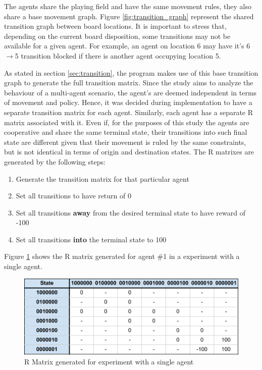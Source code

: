 \documentclass[11pt]{article}
\begin{document}
    The agents share the playing field and have the same movement rules, they also share a base movement graph. Figure \ref{fig:transition_graph} represent the shared transition graph between board locations. It is important to stress that, depending on the current board disposition, some transitions may not be available for a given agent. For example, an agent on location 6 may have it's 6$\rightarrow$5 transition blocked if there is another agent occupying location 5.

    As stated in section \ref{sec:transition}, the program makes use of this base transition graph to generate the full transition matrix. Since the study aims to analyze the behaviour of a multi-agent scenario, the agent's are deemed independent in terms of movement and policy. Hence, it was decided during implementation to have a separate transition matrix for each agent. Similarly, each agent has a separate R matrix associated with it. Even if, for the purposes of this study the agents are cooperative and share the same terminal state, their transitions into such final state are different given that their movement is ruled by the same constraints, but is not identical in terms of origin and destination states. The R matrixes are generated by the following steps:
    \begin{enumerate}
        \item Generate the transition matrix for that particular agent
        \item Set all transitions to have return of 0
        \item Set all transitions \textbf{away} from the desired terminal state to have reward of -100
        \item Set all transitions \textbf{into} the terminal state to 100
    \end{enumerate}

    Figure \ref{fig:r_matrix} shows the R matrix generated for agent \#1 in a experiment with a single agent.

    \begin{figure}[h]
        \centering
        \includegraphics[height=4cm]{./Images/5_R_Matrix.png}
        \caption{R Matrix generated for experiment with a single agent}
        \label{fig:r_matrix}
    \end{figure}
\end{document}
